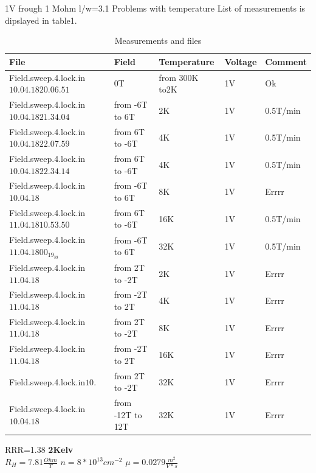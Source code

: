 \documentclass[idxtotoc,hyperref,openany,oneside]{labbook} %
\begin{document}
1V frough 1 Mohm l/w=3.1
Problems with temperature
List of measurements is dipslayed in  table1.
 \begin{table}[H]
\begin{tabular}{l l l l l}
\toprule
\textbf{File} & \textbf{Field} & \textbf{Temperature}& \textbf{Voltage}& \textbf{Comment}\\
\toprule
Field.sweep.4.lock.in$10.04.18 20.06.51$& 0T   & from 300K to2K & 1V& Ok\\
Field.sweep.4.lock.in$10.04.18 21.34.04$& from -6T to 6T & 2K & 1V& 0.5T/min\\
Field.sweep.4.lock.in$10.04.18 22.07.59$& from 6T to -6T & 4K & 1V& 0.5T/min\\
Field.sweep.4.lock.in$10.04.18 22.34.14$& from 6T to -6T & 4K & 1V& 0.5T/min\\
Field.sweep.4.lock.in$10.04.18 $& from -6T to 6T & 8K & 1V& Errrr\\
Field.sweep.4.lock.in$11.04.18 10.53.50$& from 6T to -6T & 16K & 1V& 0.5T/min\\
Field.sweep.4.lock.in$11.04.18 00_19_39$& from -6T to 6T & 32K & 1V& 0.5T/min\\
Field.sweep.4.lock.in$11.04.18 $& from 2T to -2T & 2K & 1V& Errrr\\
Field.sweep.4.lock.in$11.04.18 $& from -2T to 2T & 4K & 1V& Errrr\\
Field.sweep.4.lock.in$11.04.18 $& from 2T to -2T & 8K & 1V& Errrr\\
Field.sweep.4.lock.in$11.04.18 $& from -2T to 2T & 16K & 1V& Errrr\\
Field.sweep.4.lock.in$10. $& from 2T to -2T & 32K & 1V& Errrr\\
Field.sweep.4.lock.in$10.04.18 $& from -12T to 12T & 32K & 1V& Errrr\\






\bottomrule
\end{tabular}
\caption{Measurements and files}
\label{tab:Measurements and files}
\end{table}


RRR=1.38
\newline
\normalsize \textbf{2Kelv}\\
$R_H=7.81 \frac{Ohm}{T}$
\newline
$n=8*10^{13} cm^{-2}$
\newline
$\mu= 0.0279\frac{m^2}{V*s}$
\newline
\newline
\end{document}
